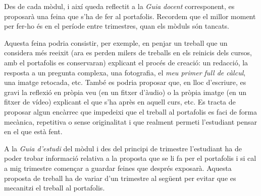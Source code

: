 \documentclass[oneside,a4paper,12pt]{refart}
\begin{document}
Des de cada mòdul, i així queda reflectit a la \textit{Guia docent} corresponent,  es proposarà una feina que s'ha de fer al portafolis. Recordem que el millor moment per fer-ho és en el període entre trimestres, quan els mòduls són tancats. 

Aquesta feina podria consistir, per exemple, en penjar un treball que un considera més reeixit (ara es perden milers de treballs en els reinicis dels cursos, amb el portafolis es conservaran) explicant el procés de creació: un redacció, la resposta a un pregunta complexa, una fotografia, el \textit{meu primer full de càlcul}, una imatge retocada, etc. També es podria proposar que, en lloc d'escriure, es gravi la reflexió en pròpia veu (en un fitxer d'àudio) o la pròpia imatge (en un fitxer de vídeo) explicant el que s'ha après en aquell curs, etc. Es tracta de proposar algun encàrrec que impedeixi que el treball al portafolis es faci de forma mecànica, repetitiva o sense originalitat i que realment permeti l'estudiant pensar en el que està fent.

A la \textit{Guia d'estudi} del mòdul i des del principi de trimestre l'estudiant ha de poder trobar informació relativa a la proposta que se li fa per el portafolis i si cal a mig trimestre començar a guardar feines que després exposarà. Aquesta proposta de treball ha de variar d'un trimestre al següent per evitar que es mecanitzi el treball al portafolis.
\end{document}
